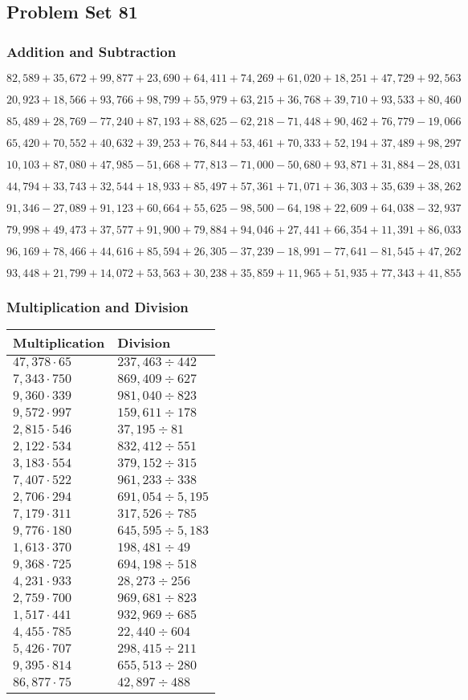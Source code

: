 \hypertarget{problem-set-81}{%
\subsection{Problem Set 81}\label{problem-set-81}}

\hypertarget{addition-and-subtraction-303}{%
\subsubsection{Addition and
Subtraction}\label{addition-and-subtraction-303}}

\(82,589+35,672+99,877+23,690+64,411+74,269+61,020+18,251+47,729+ 92,563\)

\(20,923+18,566+93,766+98,799+55,979+63,215+36,768+39,710+93,533+80,460\)

\(85,489+28,769-77,240+87,193+88,625-62,218-71,448+90,462+76,779-19,066\)

\(65,420+70,552+40,632+39,253+76,844+53,461+70,333+52,194+37,489+98,297\)

\(10,103+87,080+47,985-51,668+77,813-71,000-50,680+93,871+31,884-28,031\)

\(44,794+33,743+32,544+18,933+85,497+57,361+71,071+36,303+35,639+38,262\)

\(91,346-27,089+91,123+60,664+55,625-98,500-64,198+22,609+64,038-32,937\)

\(79,998+49,473+37,577+91,900+79,884+94,046+27,441+66,354+11,391+86,033\)

\(96,169+78,466+44,616+85,594+26,305-37,239-18,991-77,641-81,545+47,262\)

\(93,448+21,799+14,072+53,563+30,238+35,859+11,965+51,935+77,343+41,855\)

\hypertarget{multiplication-and-division-302}{%
\subsubsection{Multiplication and
Division}\label{multiplication-and-division-302}}

\begin{longtable}[]{@{}ll@{}}
\toprule
Multiplication & Division\tabularnewline
\midrule
\endhead
\(47,378\cdot65\) & \(237,463÷442\)\tabularnewline
\(7,343\cdot750\) & \(869,409÷627\)\tabularnewline
\(9,360\cdot339\) & \(981,040÷823\)\tabularnewline
\(9,572\cdot997\) & \(159,611÷178\)\tabularnewline
\(2,815\cdot546\) & \(37,195÷81\)\tabularnewline
\(2,122\cdot534\) & \(832,412÷551\)\tabularnewline
\(3,183\cdot554\) & \(379,152÷315\)\tabularnewline
\(7,407\cdot522\) & \(961,233÷338\)\tabularnewline
\(2,706\cdot294\) & \(691,054÷5,195\)\tabularnewline
\(7,179\cdot311\) & \(317,526÷785\)\tabularnewline
\(9,776\cdot180\) & \(645,595÷5,183\)\tabularnewline
\(1,613\cdot370\) & \(198,481÷49\)\tabularnewline
\(9,368\cdot725\) & \(694,198÷518\)\tabularnewline
\(4,231\cdot933\) & \(28,273÷256\)\tabularnewline
\(2,759\cdot700\) & \(969,681÷823\)\tabularnewline
\(1,517\cdot441\) & \(932,969÷685\)\tabularnewline
\(4,455\cdot785\) & \(22,440÷604\)\tabularnewline
\(5,426\cdot707\) & \(298,415÷211\)\tabularnewline
\(9,395\cdot814\) & \(655,513÷280\)\tabularnewline
\(86,877\cdot75\) & \(42,897÷488\)\tabularnewline
\bottomrule
\end{longtable}

